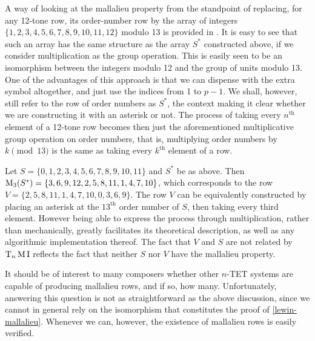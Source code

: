 A way of looking at the mallalieu property from the standpoint of replacing, for any 12-tone row, its order-number row by the array of integers $\{ 1, 2, 3, 4, 5, 6, 7, 8, 9, 10, 11, 12 \}$ modulo 13 is provided in \cite[278]{Lewin1966}. It is easy to see that such an array has the same structure as the array $S^*$ constructed above, if we consider multiplication as the group operation. This is easily seen to be an isomorphism between the integers modulo 12 and the group of units modulo 13. One of the advantages of this approach is that we can dispense with the extra symbol altogether, and just use the indices from 1 to $p - 1$. We shall, however, still refer to the row of order numbers as $S^*$, the context making it clear whether we are constructing it with an asterisk or not. The process of taking every $n^\text{th}$ element of a 12-tone row becomes then just the aforementioned multiplicative group operation on order numbers, that is, multiplying order numbers by $k \pmod{13}$ is the same as taking every $k^\text{th}$ element of a row.

\begin{example}
	Let $S = \{ 0, 1, 2, 3, 4, 5, 6, 7, 8, 9, 10, 11 \}$ and $S^*$ be as above. Then $\operatorname{M}_3(S^*) = \{ 3, 6, 9, 12, 2, 5, 8, 11, 1, 4, 7, 10 \}$, which corresponds to the row $V = \{ 2, 5, 8, 11, 1, 4, 7, 10, 0, 3, 6, 9 \}$. The row $V$ can be equivalently constructed by placing an asterisk at the $13^\text{th}$ order number of $S$, then taking every third element. However being able to express the process through multiplication, rather than mechanically, greatly facilitates its theoretical description, as well as any algorithmic implementation thereof. The fact that $V$ and $S$ are not related by $\operatorname{T}_n\operatorname{M}\operatorname{I}$ reflects the fact that neither $S$ nor $V$ have the mallalieu property.
\end{example}

It should be of interest to many composers whether other $n$-TET systems are capable of producing mallalieu rows, and if so, how many. Unfortunately, answering this question is not as straightforward as the above discussion, since we cannot in general rely on the isomorphism that constitutes the proof of \ref{lewin-mallalieu}. Whenever we can, however, the existence of mallalieu rows is easily verified.

